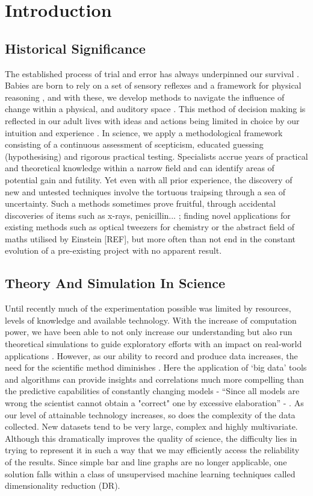 
\section{Introduction}

\subsection{Historical Significance}
The established process of trial and error has always underpinned our survival \citep{TrialandError}. Babies are born to rely on a set of sensory reflexes and a framework for physical reasoning \citep{pr}, and with these, we develop methods to navigate the influence of change within a physical, and auditory space \citep{objects}. This method of decision making is reflected in our adult lives with ideas and actions being limited in choice by our intuition and experience \citep{descartes}. In science, we apply a methodological framework consisting of a continuous assessment of scepticism, educated guessing (hypothesising) and rigorous practical testing. Specialists accrue years of practical and theoretical knowledge within a narrow field and can identify areas of potential gain and futility. Yet even with all prior experience, the discovery of new and untested techniques involve the tortuous traipsing through a sea of uncertainty. Such a methods sometimes prove fruitful, through accidental discoveries of items such as x-rays, penicillin... \citep{accidental}; finding novel applications for existing methods such as optical tweezers for chemistry or the abstract field of maths utilised by Einstein [REF], but more often than not end in the constant evolution of a pre-existing project with no apparent result.

\subsection{Theory And Simulation In Science}

Until recently much of the experimentation possible was limited by resources, levels of knowledge and available technology. With the increase of computation power, we have been able to not only increase our understanding but also run theoretical simulations to guide exploratory efforts with an impact on real-world applications \citep{dft,lion,theoreticalbio,drug}. However, as our ability to record and produce data increases, the need for the scientific method diminishes \citep{wired}. Here the application of `big data' tools and algorithms can provide insights and correlations much more compelling than the predictive capabilities of constantly changing models - ``Since all models are wrong the scientist cannot obtain
a "correct" one by excessive elaboration'' - \cite{allmodels}. As our level of attainable technology increases, so does the complexity of the data collected. New datasets tend to be very large, complex and highly multivariate. Although this dramatically improves the quality of science, the difficulty lies in trying to represent it in such a way that we may efficiently access the reliability of the results. Since simple bar and line graphs are no longer applicable, one solution falls within a class of unsupervised machine learning techniques called dimensionality reduction (DR).


